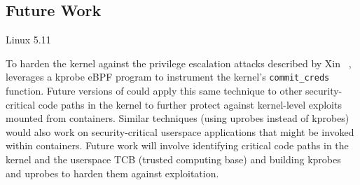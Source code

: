 \subsection{Future Work}
\label{sub:future_work}


Linux 5.11 




To harden the kernel against the privilege escalation attacks described by Xin \etal~\cite{xin2018_container_security}, \bpfcontain{} leverages a kprobe eBPF program to instrument the kernel's \texttt{commit\_creds} function. Future versions of \bpfcontain{} could apply this same technique to other security-critical code paths in the kernel to further protect against kernel-level exploits mounted from containers. Similar techniques (using uprobes instead of kprobes) would also work on security-critical userspace applications that might be invoked within containers. Future work will involve identifying critical code paths in the kernel and the userspace TCB (trusted computing base) and building \bpfcontain{} kprobes and uprobes to harden them against exploitation.
